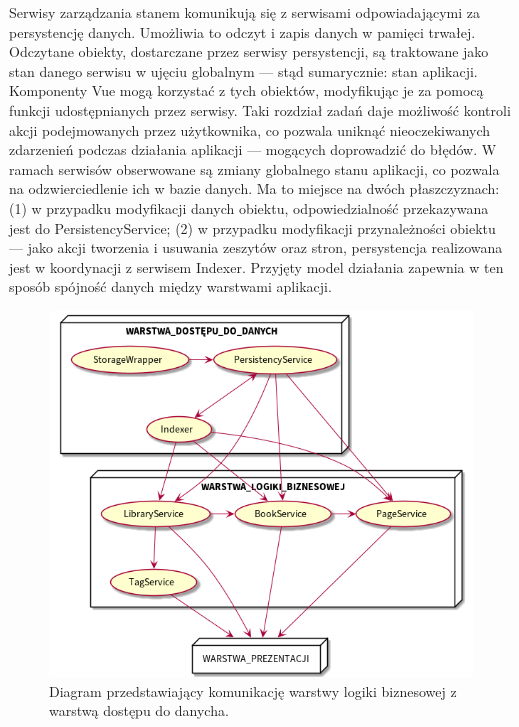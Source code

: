 Serwisy zarządzania stanem komunikują się z serwisami odpowiadającymi za persystencję danych.
Umożliwia to odczyt i zapis danych w pamięci trwałej. Odczytane obiekty, dostarczane przez serwisy persystencji,
są traktowane jako stan danego serwisu w ujęciu globalnym — stąd sumarycznie: stan aplikacji.
Komponenty Vue mogą korzystać z tych obiektów, modyfikując je za pomocą funkcji udostępnianych przez serwisy.
Taki rozdział zadań daje możliwość kontroli akcji podejmowanych przez użytkownika, co pozwala uniknąć nieoczekiwanych
zdarzenień podczas działania aplikacji — mogących doprowadzić do błędów.
W ramach serwisów obserwowane są zmiany globalnego stanu aplikacji, co pozwala na odzwierciedlenie ich w bazie danych.
Ma to miejsce na dwóch płaszczyznach: (1) w przypadku modyfikacji danych obiektu,
odpowiedzialność przekazywana jest do PersistencyService; (2) w przypadku modyfikacji przynależności obiektu — jako akcji
tworzenia i usuwania zeszytów oraz stron, persystencja realizowana jest w koordynacji z serwisem Indexer.
Przyjęty model działania zapewnia w ten sposób spójność danych między warstwami aplikacji.

\begin{figure}[H]
	\begin{center}
		\includegraphics[scale=0.5]{media/LayerComunication.png}
	\end{center}
	\caption{Diagram przedstawiający komunikację warstwy logiki biznesowej z warstwą dostępu do danycha.}
	\label{rys:layer-communication}
\end{figure}

